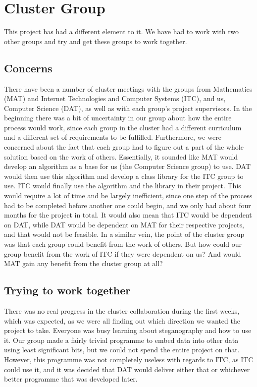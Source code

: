\section{Cluster Group}
This project has had a different element to it.
We have had to work with two other groups and try and get these groups to work together.
\subsection*{Concerns}
There have been a number of cluster meetings with the groups from Mathematics (MAT) and Internet Technologies and Computer Systems (ITC), and us, Computer Science (DAT), as well as with each group's project supervisors.
In the beginning there was a bit of uncertainty in our group about how the entire process would work, since each group in the cluster had a different curriculum and a different set of requirements to be fulfilled.
Furthermore, we were concerned about the fact that each group had to figure out a part of the whole solution based on the work of others.
Essentially, it sounded like MAT would develop an algorithm as a base for us (the Computer Science group) to use.
DAT would then use this algorithm and develop a class library for the ITC group to use.
ITC would finally use the algorithm and the library in their project.
This would require a lot of time and be largely inefficient, since one step of the process had to be completed before another one could begin, and we only had about four months for the project in total.
It would also mean that ITC would be dependent on DAT, while DAT would be dependent on MAT for their respective projects, and that would not be feasible.
In a similar vein, the point of the cluster group was that each group could benefit from the work of others.
But how could our group benefit from the work of ITC if they were dependent on us? And would MAT gain any benefit from the cluster group at all?

\subsection*{Trying to work together}
There was no real progress in the cluster collaboration during the first weeks, which was expected, as we were all finding out which direction we wanted the project to take.
Everyone was busy learning about steganography and how to use it.
Our group made a fairly trivial programme to embed data into other data using least significant bits, but we could not spend the entire project on that.
However, this programme was not completely useless with regards to ITC, as ITC could use it, and it was decided that DAT would deliver either that or whichever better programme that was developed later.


